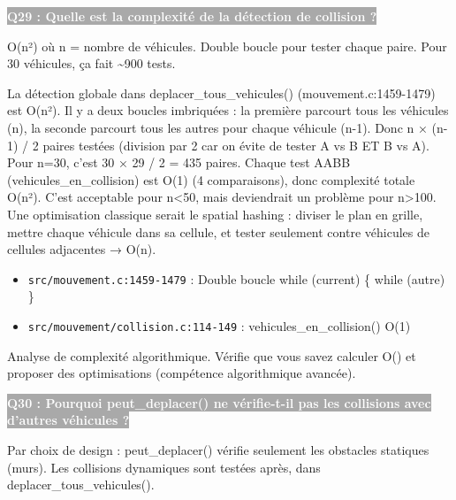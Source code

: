 \documentclass[12pt,a4paper]{article}
\newcommand{\question}[1]{%
    \vspace{0.5cm}
    \noindent\colorbox{darkgray}{\textcolor{white}{\textbf{#1}}}
    \vspace{0.3cm}
}
\begin{document}
\question{Q29 : Quelle est la complexité de la détection de collision ?}

\begin{reponse_courte}
O(n²) où n = nombre de véhicules. Double boucle pour tester chaque paire. Pour 30 véhicules, ça fait \textasciitilde{}900 tests.
\end{reponse_courte}

\begin{reponse_longue}
La détection globale dans deplacer\_tous\_vehicules() (mouvement.c:1459-1479) est O(n²). Il y a deux boucles imbriquées : la première parcourt tous les véhicules (n), la seconde parcourt tous les autres pour chaque véhicule (n-1). Donc n × (n-1) / 2 paires testées (division par 2 car on évite de tester A vs B ET B vs A). Pour n=30, c'est 30 × 29 / 2 = 435 paires. Chaque test AABB (vehicules\_en\_collision) est O(1) (4 comparaisons), donc complexité totale O(n²). C'est acceptable pour n<50, mais deviendrait un problème pour n>100. Une optimisation classique serait le spatial hashing : diviser le plan en grille, mettre chaque véhicule dans sa cellule, et tester seulement contre véhicules de cellules adjacentes → O(n).
\end{reponse_longue}

\begin{reference_code}
\begin{itemize}
    \item \texttt{src/mouvement.c:1459-1479} : Double boucle while (current) \{ while (autre) \}
    \item \texttt{src/mouvement/collision.c:114-149} : vehicules\_en\_collision() O(1)
\end{itemize}
\end{reference_code}

\begin{objectif_prof}
Analyse de complexité algorithmique. Vérifie que vous savez calculer O() et proposer des optimisations (compétence algorithmique avancée).
\end{objectif_prof}

\question{Q30 : Pourquoi peut\_deplacer() ne vérifie-t-il pas les collisions avec d'autres véhicules ?}

\begin{reponse_courte}
Par choix de design : peut\_deplacer() vérifie seulement les obstacles statiques (murs). Les collisions dynamiques sont testées après, dans deplacer\_tous\_vehicules().
\end{reponse_courte}
\end{document}
